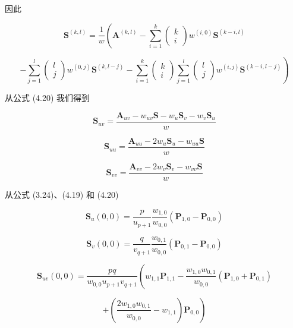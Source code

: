 \documentclass[../main.tex]{subfiles}
\begin{document}
因此

\[
{\mathbf{S}}^{\left( k,l\right) } = \frac{1}{w}\left( {{\mathbf{A}}^{\left( k,l\right) } - \mathop{\sum }\limits_{{i = 1}}^{k}\left( \begin{matrix} k \\  i \end{matrix}\right) {w}^{\left( i,0\right) }{\mathbf{S}}^{\left( k - i,l\right) }}\right.
\]

\[
\left. {-\mathop{\sum }\limits_{{j = 1}}^{l}\left( \begin{array}{l} l \\  j \end{array}\right) {w}^{\left( 0,j\right) }{\mathbf{S}}^{\left( k,l - j\right) } - \mathop{\sum }\limits_{{i = 1}}^{k}\left( \begin{matrix} k \\  i \end{matrix}\right) \mathop{\sum }\limits_{{j = 1}}^{l}\left( \begin{array}{l} l \\  j \end{array}\right) {w}^{\left( i,j\right) }{\mathbf{S}}^{\left( k - i,l - j\right) }}\right)  \tag{4.20}
\]

从公式 (4.20) 我们得到

\[
{\mathbf{S}}_{uv} = \frac{{\mathbf{A}}_{uv} - {w}_{uv}\mathbf{S} - {w}_{u}{\mathbf{S}}_{v} - {w}_{v}{\mathbf{S}}_{u}}{w} \tag{4.21}
\]

\[
{\mathbf{S}}_{uu} = \frac{{\mathbf{A}}_{uu} - 2{w}_{u}{\mathbf{S}}_{u} - {w}_{uu}\mathbf{S}}{w} \tag{4.22}
\]

\[
{\mathbf{S}}_{vv} = \frac{{\mathbf{A}}_{vv} - 2{w}_{v}{\mathbf{S}}_{v} - {w}_{vv}\mathbf{S}}{w} \tag{4.23}
\]

从公式 (3.24)、(4.19) 和 (4.20)

\[
{\mathbf{S}}_{u}\left( {0,0}\right)  = \frac{p}{{u}_{p + 1}}\frac{{w}_{1,0}}{{w}_{0,0}}\left( {{\mathbf{P}}_{1,0} - {\mathbf{P}}_{0,0}}\right)  \tag{4.24}
\]

\[
{\mathbf{S}}_{v}\left( {0,0}\right)  = \frac{q}{{v}_{q + 1}}\frac{{w}_{0,1}}{{w}_{0,0}}\left( {{\mathbf{P}}_{0,1} - {\mathbf{P}}_{0,0}}\right)  \tag{4.25}
\]

\[
{\mathbf{S}}_{uv}\left( {0,0}\right)  = \frac{pq}{{w}_{0,0}{u}_{p + 1}{v}_{q + 1}}\left( {{w}_{1,1}{\mathbf{P}}_{1,1} - \frac{{w}_{1,0}{w}_{0,1}}{{w}_{0,0}}\left( {{\mathbf{P}}_{1,0} + {\mathbf{P}}_{0,1}}\right) }\right.
\]

\[
\left. {+\left( {\frac{2{w}_{1,0}{w}_{0,1}}{{w}_{0,0}} - {w}_{1,1}}\right) {\mathbf{P}}_{0,0}}\right)  \tag{4.26}
\]
\end{document}
